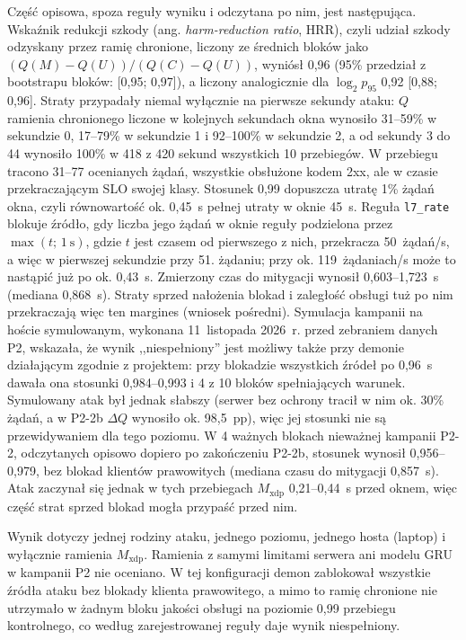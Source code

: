 \documentclass[a4paper,12pt]{article}
\begin{document}
Część opisowa, spoza reguły wyniku i odczytana po nim, jest następująca. Wskaźnik redukcji szkody (ang. \textit{harm-reduction ratio}, HRR), czyli udział szkody odzyskany przez ramię chronione, liczony ze średnich bloków jako $(Q(M) - Q(U))/(Q(C) - Q(U))$, wyniósł 0,96 (95\% przedział z bootstrapu bloków: [0,95; 0,97]), a liczony analogicznie dla $\log_2 p_{95}$ 0,92 [0,88; 0,96]. Straty przypadały niemal wyłącznie na pierwsze sekundy ataku: $Q$ ramienia chronionego liczone w kolejnych sekundach okna wynosiło 31--59\% w sekundzie 0, 17--79\% w sekundzie 1 i 92--100\% w sekundzie 2, a od sekundy 3 do 44 wynosiło 100\% w 418 z 420 sekund wszystkich 10 przebiegów. W przebiegu tracono 31--77 ocenianych żądań, wszystkie obsłużone kodem 2xx, ale w czasie przekraczającym SLO swojej klasy. Stosunek 0,99 dopuszcza utratę 1\% żądań okna, czyli równowartość ok. 0,45~s pełnej utraty w oknie 45~s. Reguła \texttt{l7\_rate} blokuje źródło, gdy liczba jego żądań w oknie reguły podzielona przez $\max(t;\, 1~\mathrm{s})$, gdzie $t$ jest czasem od pierwszego z nich, przekracza 50~żądań/s, a więc w pierwszej sekundzie przy 51. żądaniu; przy ok. 119~żądaniach/s może to nastąpić już po ok. 0,43~s. Zmierzony czas do mitygacji wynosił 0,603--1,723~s (mediana 0,868~s). Straty sprzed nałożenia blokad i zaległość obsługi tuż po nim przekraczają więc ten margines (wniosek pośredni). Symulacja kampanii na hoście symulowanym, wykonana 11~listopada 2026~r. przed zebraniem danych P2, wskazała, że wynik ,,niespełniony'' jest możliwy także przy demonie działającym zgodnie z projektem: przy blokadzie wszystkich źródeł po 0,96~s dawała ona stosunki 0,984--0,993 i 4 z 10 bloków spełniających warunek. Symulowany atak był jednak słabszy (serwer bez ochrony tracił w nim ok. 30\% żądań, a w P2-2b $\Delta Q$ wynosiło ok. 98,5~pp), więc jej stosunki nie są przewidywaniem dla tego poziomu. W 4 ważnych blokach nieważnej kampanii P2-2, odczytanych opisowo dopiero po zakończeniu P2-2b, stosunek wynosił 0,956--0,979, bez blokad klientów prawowitych (mediana czasu do mitygacji 0,857~s). Atak zaczynał się jednak w tych przebiegach $M_{\mathrm{xdp}}$ 0,21--0,44~s przed oknem, więc część strat sprzed blokad mogła przypaść przed nim.

Wynik dotyczy jednej rodziny ataku, jednego poziomu, jednego hosta (laptop) i wyłącznie ramienia $M_{\mathrm{xdp}}$. Ramienia z samymi limitami serwera ani modelu GRU w kampanii P2 nie oceniano. W tej konfiguracji demon zablokował wszystkie źródła ataku bez blokady klienta prawowitego, a mimo to ramię chronione nie utrzymało w żadnym bloku jakości obsługi na poziomie 0,99 przebiegu kontrolnego, co według zarejestrowanej reguły daje wynik niespełniony.
\end{document}
